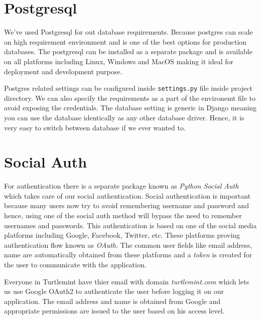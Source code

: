 \section{Postgresql}
We've used Postgresql for out database requirements. Because postgres can
scale on high requirement environment and is one of the best options for
production databases. The postgresql can be installed as a separate package
and is available on all platforms including Linux, Windows and MacOS making
it ideal for deployment and development purpose.

Postgres related settings can be configured inside \texttt{settings.py} file
inside project directory. We can also specify the requirements as a part of the
environemt file to avoid exposing the credentials. The database setting is
generic in Django meaning you can use the database identically as any other
database driver. Hence, it is very easy to switch between database if we ever
wanted to.

\section{Social Auth}
For authentication there is a separate package known as
\textit{Python Social Auth} which takes care of our social authentication.
Social authentication is important because many users now try to avoid
remembering username and password and hence, using one of the social auth
method will bypass the need to remember usernames and passwords. This
authentication is based on one of the social media platforms including Google,
Facebook, Twitter, etc. These platforms proving authentication flow known as
\textit{OAuth}. The common user fields like email address, name are
automatically obtained from these platforms and a \textit{token} is created
for the user to communicate with the application.

Everyone in Turtlemint have thier email with domain \textit{turtlemint.com}
which lets us use Google OAuth2 to authenticate the user before logging it
on our application. The email address and name is obtained from Google and
appropriate permissions are issued to the user based on his access level.
